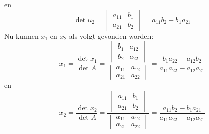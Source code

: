 en
%
\begin{equation}
\det u_2 = \begin{vmatrix}
a_{11} & b_{1} \\
a_{21} & b_{2}
\end{vmatrix} = a_{11}b_{2} - b_{1}a_{21}
\end{equation}
%
Nu kunnen $x_1$ en $x_2$ als volgt gevonden worden:
%
\begin{equation}
x_1 = \dfrac{\det x_1}{\det A} = \dfrac{\begin{vmatrix}
b_{1} & a_{12} \\
b_{2} & a_{22}
\end{vmatrix}}{\begin{vmatrix}
a_{11} & a_{12} \\
a_{21} & a_{22}
\end{vmatrix}} = \dfrac{b_{1}a_{22} - a_{12}b_{2}}{a_{11}a_{22} - a_{12}a_{21}}
\end{equation}
%
en
%
\begin{equation}
x_2 = \dfrac{\det x_2}{\det A} = \dfrac{\begin{vmatrix}
a_{11} & b_{1} \\
a_{21} & b_{2}
\end{vmatrix}}{\begin{vmatrix}
a_{11} & a_{12} \\
a_{21} & a_{22}
\end{vmatrix}} = \dfrac{a_{11}b_{2} - b_{1}a_{21}}{a_{11}a_{22} - a_{12}a_{21}}
\end{equation}

